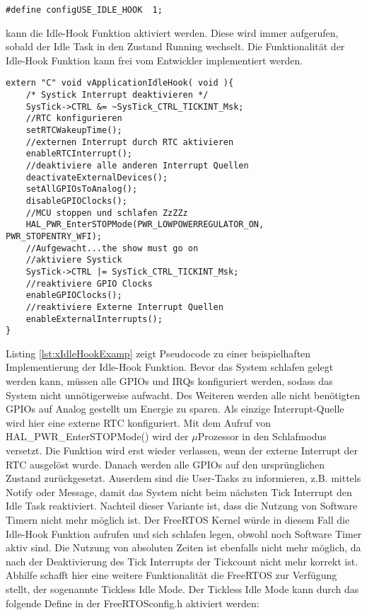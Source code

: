 \begin{lstlisting}[label=lst:defineIdleHook, numbers = none]
#define configUSE_IDLE_HOOK  1; 
\end{lstlisting}
kann die Idle-Hook Funktion aktiviert werden. Diese wird immer aufgerufen, sobald der Idle Task in den Zustand Running wechselt. Die Funktionalität der Idle-Hook Funktion kann frei vom Entwickler implementiert werden. 
\begin{lstlisting}[caption={Pseudocode für eine Idle-Hook Funktion.},captionpos=b, label=lst:xIdleHookExamp, float=hbt!]
extern "C" void vApplicationIdleHook( void ){
	/* Systick Interrupt deaktivieren */
	SysTick->CTRL &= ~SysTick_CTRL_TICKINT_Msk;
	//RTC konfigurieren
	setRTCWakeupTime();
	//externen Interrupt durch RTC aktivieren
	enableRTCInterrupt();
	//deaktiviere alle anderen Interrupt Quellen
	deactivateExternalDevices();
	setAllGPIOsToAnalog(); 
	disableGPIOClocks();
	//MCU stoppen und schlafen ZzZZz
	HAL_PWR_EnterSTOPMode(PWR_LOWPOWERREGULATOR_ON, PWR_STOPENTRY_WFI); 
	//Aufgewacht...the show must go on
	//aktiviere Systick
	SysTick->CTRL |= SysTick_CTRL_TICKINT_Msk;
	//reaktiviere GPIO Clocks
	enableGPIOClocks();
	//reaktiviere Externe Interrupt Quellen
	enableExternalInterrupts();	
}
\end{lstlisting}
\newline  %
Listing \ref{lst:xIdleHookExamp} zeigt Pseudocode zu einer beispielhaften Implementierung der Idle-Hook Funktion. Bevor das System schlafen gelegt werden kann, müssen alle GPIOs und IRQs konfiguriert werden, sodass das System nicht unnötigerweise aufwacht. Des Weiteren werden alle nicht benötigten GPIOs auf Analog gestellt um Energie zu sparen. Als einzige Interrupt-Quelle wird hier eine externe RTC konfiguriert. Mit dem Aufruf von HAL\_PWR\_EnterSTOPMode() wird der $\mu$\-Pro\-zesso\-r in den Schlafmodus versetzt. Die Funktion wird erst wieder verlassen, wenn der externe Interrupt der RTC ausgelöst wurde. Danach werden alle GPIOs auf den ursprünglichen Zustand zurückgesetzt. Auserdem sind die User-Tasks zu informieren, z.B. mittels Notify oder Message, damit das System nicht beim nächsten Tick Interrupt den Idle Task reaktiviert. Nachteil dieser Variante ist, dass die Nutzung von Software Timern nicht mehr möglich ist. Der FreeRTOS Kernel würde in diesem Fall die Idle-Hook Funktion aufrufen und sich schlafen legen, obwohl noch Software Timer aktiv sind. Die Nutzung von absoluten Zeiten ist ebenfalls nicht mehr möglich, da nach der Deaktivierung des Tick Interrupts der Tickcount nicht mehr korrekt ist. Abhilfe schafft hier eine weitere Funktionalität die FreeRTOS zur Verfügung stellt, der sogenannte Tickless Idle Mode. Der Tickless Idle Mode kann durch das folgende Define in der FreeRTOSconfig.h aktiviert werden:  
